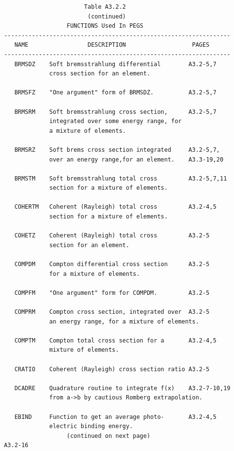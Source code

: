 \newpage  {}\begin{verbatim}
                        Table A3.2.2
                         (continued)
                   FUNCTIONS Used In PEGS
 -----------------------------------------------------------------
    NAME                 DESCRIPTION                   PAGES
 -----------------------------------------------------------------
    BRMSDZ    Soft bremsstrahlung differential        A3.2-5,7
              cross section for an element.
 
    BRMSFZ    "One argument" form of BRMSDZ.          A3.2-5,7
 
    BRMSRM    Soft bremsstrahlung cross section,      A3.2-5,7
              integrated over some energy range, for
              a mixture of elements.
 
    BRMSRZ    Soft brems cross section integrated     A3.2-5,7,
              over an energy range,for an element.    A3.3-19,20
 
    BRMSTM    Soft bremsstrahlung total cross         A3.2-5,7,11
              section for a mixture of elements.
 
    COHERTM   Coherent (Rayleigh) total cross         A3.2-4,5
              section for a mixture of elements.
 
    COHETZ    Coherent (Rayleigh) total cross         A3.2-5
              section for an element.
 
    COMPDM    Compton differential cross section      A3.2-5
              for a mixture of elements.
 
    COMPFM    "One argument" form for COMPDM.         A3.2-5
 
    COMPRM    Compton cross section, integrated over  A3.2-5
              an energy range, for a mixture of elements.
 
    COMPTM    Compton total cross section for a       A3.2-4,5
              mixture of elements.
 
    CRATIO    Coherent (Rayleigh) cross section ratio A3.2-5
 
    DCADRE    Quadrature routine to integrate f(x)    A3.2-7-10,19
              from a->b by cautious Romberg extrapolation.
 
    EBIND     Function to get an average photo-       A3.2-4,5
              electric binding energy.
                   (continued on next page)
 A3.2-16
\end{verbatim} 
